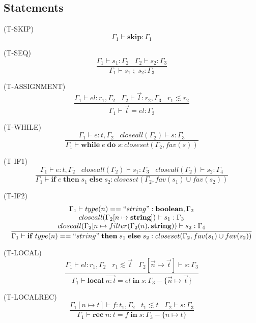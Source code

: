 \documentclass{paper}
\newcommand{\Boolean}{\mathbf{boolean}}
\newcommand{\String}{\mathbf{string}}
\newcommand{\mylabel}[1]{\; (\textsc{#1})}
\newcommand{\env}{\Gamma}
\begin{document}
\subsection{Statements}

\noindent

\mylabel{T-SKIP}
\[
\env_{1} \vdash \mathbf{skip}:\env_{1}
\]

\mylabel{T-SEQ}
\[
\dfrac{\env_{1} \vdash s_{1}:\env_{2} \;\;\;
       \env_{2} \vdash s_{2}:\env_{3}}
      {\env_{1} \vdash s_{1} \; ; \; s_{2}:\env_{3}}
\]

\mylabel{T-ASSIGNMENT}
\[
\dfrac{\env_{1} \vdash el:r_{1}, \env_{2} \;\;\;
       \env_{2} \vdash \vec{l}:r_{2}, \env_{3} \;\;\;
       r_{1} \lesssim r_{2}}
      {\env_{1} \vdash \vec{l} = el:\env_{3}}
\]

\mylabel{T-WHILE}
\[
\dfrac{\env_{1} \vdash e:t, \env_{2} \;\;\;
       closeall(\env_{2}) \vdash s:\env_{3}}
      {\env_{1} \vdash \mathbf{while} \; e \; \mathbf{do} \; s:closeset(\env_{2}, fav(s))}
\]

\mylabel{T-IF1}
\[
\dfrac{\env_{1} \vdash e:t, \env_{2} \;\;\;
       closeall(\env_{2}) \vdash s_{1}:\env_{3} \;\;\;
       closeall(\env_{2}) \vdash s_{2}:\env_{4}}
      {\env_{1} \vdash \mathbf{if} \; e \; \mathbf{then} \; s_{1} \; \mathbf{else} \; s_{2}:closeset(\env_{2}, fav(s_{1}) \cup fav(s_{2}))}
\]

\mylabel{T-IF2}
\[
\dfrac{\begin{array}{c}
       \env_{1} \vdash type(n) == ``string":\Boolean, \env_{2} \\
       closeall(\env_{2}[n \mapsto \String]) \vdash s_{1}:\env_{3} \\
       closeall(\env_{2}[n \mapsto filter(\env_{2}(n), \String)) \vdash s_{2}:\env_{4}
      \end{array}}
      {\env_{1} \vdash \mathbf{if} \; type(n) == ``string" \; \mathbf{then} \; s_{1} \; \mathbf{else} \; s_{2}:closeset(\env_{2}, fav(s_{1}) \cup fav(s_{2}))}
\]

\mylabel{T-LOCAL}
\[
\dfrac{\env_{1} \vdash el:r_{1}, \env_{2} \;\;\;
       r_{1} \lesssim \vec{t} \;\;\;
       \env_{2}[\vec{n} \mapsto \vec{t}] \vdash s:\env_{3}}
      {\env_{1} \vdash \mathbf{local} \; \vec{n{:}t} = el \; \mathbf{in} \; s:\env_{3} - \{\vec{n} \mapsto \vec{t}\}}
\]

\mylabel{T-LOCALREC}
\[
\dfrac{\env_{1}[n \mapsto t] \vdash f:t_{1}, \env_{2} \;\;\;
       t_{1} \lesssim t \;\;\;
       \env_{2} \vdash s:\env_{3}}
      {\env_{1} \vdash \mathbf{rec} \; n{:}t = f \; \mathbf{in} \; s:\env_{3} - \{n \mapsto t\}}
\]
\end{document}
